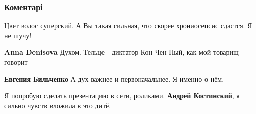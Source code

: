  
 
 
 
 
\subsubsection{Коментарі}
\label{sec:05_08_2021.fb.bilchenko_evgenia.1.medicina_literatura.cmt}

\begin{itemize}
 
Цвет волос суперский. А Вы такая сильная, что скорее хрониосепсис сдастся. Я не шучу!

\begin{itemize}
 
\textbf{Anna Denisova} Духом. Тельце - диктатор Кон Чен Ный, как мой товарищ говорит

 
\textbf{Евгения Бильченко} А дух важнее и первоначальнее. Я именно о нём.
\end{itemize}

 
Я попробую сделать презентацию в сети, роликами. \textbf{Андрей Костинский}, я сильно
чувств вложила в это дитё.


\end{itemize}
